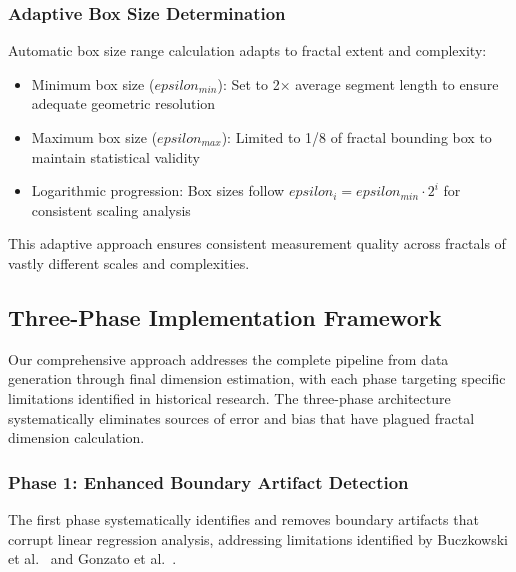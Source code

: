 \documentclass[preprint,12pt]{elsarticle}
\def\textbf#1{#1}%
\def\epsilon{epsilon}%
\begin{document}
\subsubsection{Adaptive Box Size Determination}

Automatic box size range calculation adapts to fractal extent and complexity:

\begin{itemize}
\item \textbf{Minimum box size ($\epsilon_{min}$)}: Set to 2× average segment length to ensure adequate geometric resolution
\item \textbf{Maximum box size ($\epsilon_{max}$)}: Limited to 1/8 of fractal bounding box to maintain statistical validity
\item \textbf{Logarithmic progression}: Box sizes follow $\epsilon_i = \epsilon_{min} \cdot 2^i$ for consistent scaling analysis
\end{itemize}

This adaptive approach ensures consistent measurement quality across fractals of vastly different scales and complexities.

\subsection{Three-Phase Implementation Framework}

Our comprehensive approach addresses the complete pipeline from data generation through final dimension estimation, with each phase targeting specific limitations identified in historical research. The three-phase architecture systematically eliminates sources of error and bias that have plagued fractal dimension calculation.

\subsubsection{Phase 1: Enhanced Boundary Artifact Detection}

The first phase systematically identifies and removes boundary artifacts that corrupt linear regression analysis, addressing limitations identified by Buczkowski et al.~\cite{buczkowski1998} and Gonzato et al.~\cite{gonzato1998}.
\end{document}

